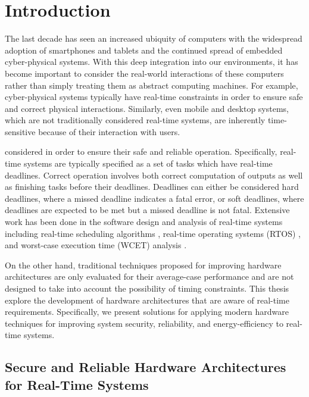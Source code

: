 \chapter{Introduction}
\label{chap:intro}

The last decade has seen an increased ubiquity of computers with the widespread
adoption of smartphones and tablets and the continued spread of embedded
cyber-physical systems. With this deep integration into our environments, it has
become important to consider the real-world interactions of these computers
rather than simply treating them as abstract computing machines. For example,
cyber-physical systems typically have real-time constraints in order to ensure
safe and correct physical interactions. Similarly, even mobile and desktop
systems, which are not traditionally considered real-time systems, are
inherently time-sensitive because of their interaction with users.

considered in order to ensure their safe and reliable operation.  Specifically,
real-time systems are typically specified as a set of tasks which have
real-time deadlines.  Correct operation involves both correct computation of
outputs as well as finishing tasks before their deadlines.  Deadlines can
either be considered hard deadlines, where a missed deadline indicates a fatal
error, or soft deadlines, where deadlines are expected to be met but a missed
deadline is not fatal. Extensive work has been done in the software design and
analysis of real-time systems including real-time scheduling algorithms
\cite{rtschedulingsurvey-csur11}, real-time operating systems (RTOS)
\cite{rtossurvey-micro09, rtossurvey-icesc14}, and worst-case execution time
(WCET) analysis \cite{wcetsurvey-tecs08}.

On the other hand, traditional techniques proposed for improving
hardware architectures are only evaluated for their average-case
performance and are not designed to take into account the possibility of timing
constraints. This thesis explore the development of hardware
architectures that are aware of real-time requirements. Specifically, 
we present solutions for applying modern hardware techniques for improving
system security, reliability, and energy-efficiency to real-time systems.

\section{Secure and Reliable Hardware Architectures for Real-Time Systems}
\label{sec:intro.security}

